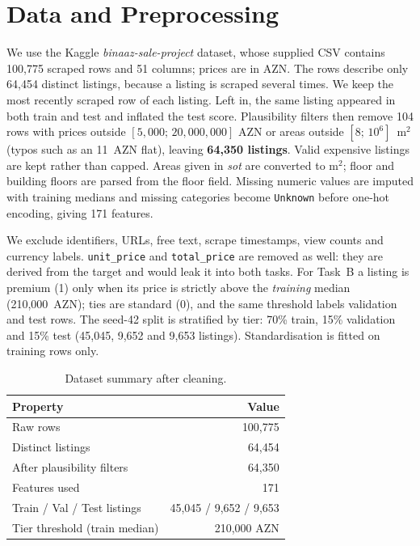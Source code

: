 \documentclass[10pt,twocolumn,a4paper]{article}
\begin{document}
\section{Data and Preprocessing}
We use the Kaggle \emph{binaaz-sale-project} dataset, whose supplied CSV
contains 100,775 scraped rows and 51 columns; prices are in AZN. The rows
describe only 64,454 distinct listings, because a listing is scraped several
times. We keep the most recently scraped row of each listing. Left in, the
same listing appeared in both train and test and inflated the test score.
Plausibility filters then remove 104 rows with prices outside
$[5{,}000;\,20{,}000{,}000]$ AZN or areas outside $[8;\,10^6]$~m$^2$ (typos
such as an 11~AZN flat), leaving \textbf{64,350 listings}. Valid expensive
listings are kept rather than capped. Areas given in \emph{sot} are converted
to m$^2$; floor and building floors are parsed from the floor field. Missing
numeric values are imputed with training medians and missing categories become
\texttt{Unknown} before one-hot encoding, giving 171 features.

We exclude identifiers, URLs, free text, scrape timestamps, view counts and
currency labels. \texttt{unit\_price} and \texttt{total\_price} are removed as
well: they are derived from the target and would leak it into both tasks.
For Task~B a listing is premium (1) only when its price is strictly above the
\emph{training} median (210,000~AZN); ties are standard (0), and the same
threshold labels validation and test rows. The seed-42 split is stratified by
tier: 70\% train, 15\% validation and 15\% test (45,045, 9,652 and 9,653
listings). Standardisation is fitted on training rows only.

\begin{table}[t]
  \centering
  \caption{Dataset summary after cleaning.}
  \label{tab:data}
  \begin{tabular}{@{}lr@{}}
    \toprule
    Property & Value \\
    \midrule
    Raw rows & 100,775 \\
    Distinct listings & 64,454 \\
    After plausibility filters & 64,350 \\
    Features used               & 171 \\
    Train / Val / Test listings & 45,045 / 9,652 / 9,653 \\
    Tier threshold (train median) & 210,000 AZN \\
    \bottomrule
  \end{tabular}
\end{table}
\end{document}
